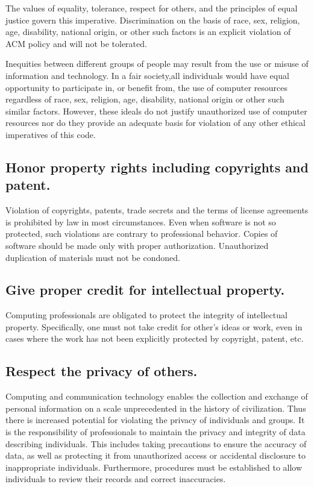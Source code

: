 \documentclass{article}
\begin{document}
The values of equality, tolerance, respect for others, and the principles of
equal justice govern this imperative. Discrimination on the basis of race, sex,
religion, age, disability, national origin, or other such factors is an
explicit violation of ACM policy and will not be tolerated.

Inequities between different groups of people may result from the use or misuse
of information and technology. In a fair society,all individuals would have
equal opportunity to participate in, or benefit from, the use of computer
resources regardless of race, sex, religion, age, disability, national origin
or other such similar factors. However, these ideals do not justify
unauthorized use of computer resources nor do they provide an adequate basis
for violation of any other ethical imperatives of this code.

\subsection{Honor property rights including copyrights and patent.}

Violation of copyrights, patents, trade secrets and the terms of license
agreements is prohibited by law in most circumstances. Even when software is
not so protected, such violations are contrary to professional behavior. Copies
of software should be made only with proper authorization. Unauthorized
duplication of materials must not be condoned.

\subsection{Give proper credit for intellectual property.}

Computing professionals are obligated to protect the integrity of intellectual
property. Specifically, one must not take credit for other's ideas or work,
even in cases where the work has not been explicitly protected by copyright,
patent, etc.

\subsection{Respect the privacy of others.}

Computing and communication technology enables the collection and exchange of
personal information on a scale unprecedented in the history of civilization.
Thus there is increased potential for violating the privacy of individuals and
groups. It is the responsibility of professionals to maintain the privacy and
integrity of data describing individuals. This includes taking precautions to
ensure the accuracy of data, as well as protecting it from unauthorized access
or accidental disclosure to inappropriate individuals. Furthermore, procedures
must be established to allow individuals to review their records and correct
inaccuracies.
\end{document}
